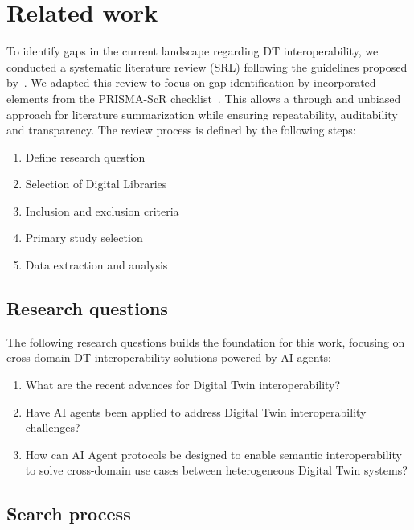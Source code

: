 \chapter{Related work}
\label{chap:related-work}

To identify gaps in the current landscape regarding DT interoperability, we conducted a
    systematic literature review (SRL) following the guidelines proposed by~\cite{kitchenham2007}.
We adapted this review to focus on gap identification by incorporated elements from the
    PRISMA-ScR checklist~\cite{tricco2018}.
This allows a through and unbiased approach for literature summarization while ensuring
    repeatability, auditability and transparency.
The review process is defined by the following steps:

\begin{enumerate}
    \item Define research question
    \item Selection of Digital Libraries
    \item Inclusion and exclusion criteria
    \item Primary study selection
    \item Data extraction and analysis
\end{enumerate}

\section{Research questions}

The following research questions builds the foundation for this work, focusing on
    cross-domain DT interoperability solutions powered by AI agents:

\begin{enumerate}[label=RQ\arabic*:]
    \item \label{rq:digital-twin} What are the recent advances for Digital Twin interoperability?
    \item \label{rq:ai-agents} Have AI agents been applied to address Digital Twin interoperability challenges?
    \item \label{rq:cross-domain} How can AI Agent protocols be designed to 
        enable semantic interoperability to solve
        cross-domain use cases between heterogeneous Digital Twin systems?
\end{enumerate}

\section{Search process}

